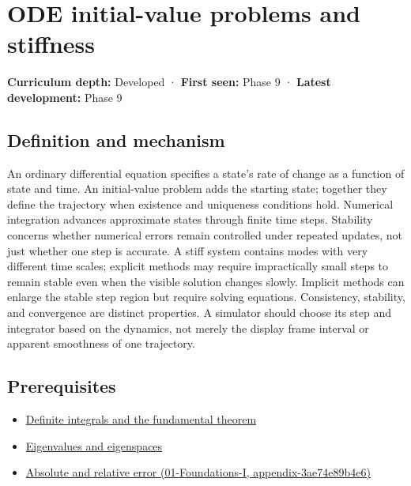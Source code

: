\hypertarget{appendix-e8ab9836882e}{}
\section{ODE initial-value problems and stiffness}\label{appendix-e8ab9836882e-ode-initial-value-problems-and-stiffness}

\textbf{Curriculum depth:} Developed · \textbf{First seen:} Phase 9 · \textbf{Latest development:} Phase 9

\subsection{Definition and mechanism}\label{appendix-e8ab9836882e-definition-and-mechanism}

An ordinary differential equation specifies a state's rate of change as a function of state and time. An initial-value problem adds the starting state; together they define the trajectory when existence and uniqueness conditions hold. Numerical integration advances approximate states through finite time steps. Stability concerns whether numerical errors remain controlled under repeated updates, not just whether one step is accurate. A stiff system contains modes with very different time scales; explicit methods may require impractically small steps to remain stable even when the visible solution changes slowly. Implicit methods can enlarge the stable step region but require solving equations. Consistency, stability, and convergence are distinct properties. A simulator should choose its step and integrator based on the dynamics, not merely the display frame interval or apparent smoothness of one trajectory.

\subsection{Prerequisites}\label{appendix-e8ab9836882e-prerequisites}

\begin{itemize}
\tightlist
\item
  \hyperref[appendix-1a50e72435c2]{Definite integrals and the fundamental theorem}
\item
  \hyperref[appendix-0b3be18411f9]{Eigenvalues and eigenspaces}
\item
  \href{../01-Foundations-I/main.pdf\#nameddest=appendix-3ae74e89b4e6}{Absolute and relative error (01-Foundations-I, appendix-3ae74e89b4e6)}
\end{itemize}

